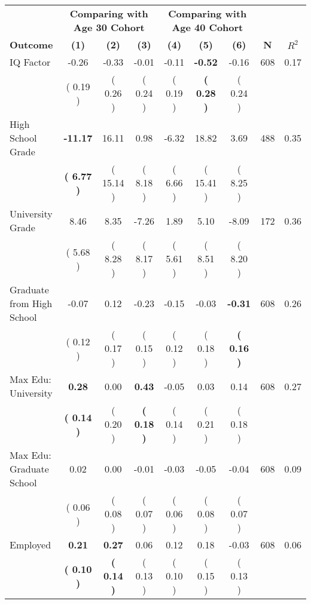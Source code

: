 \begin{tabular}{lcccccccc}
\toprule
 & \multicolumn{3}{c}{\textbf{Comparing with Age 30 Cohort}} & \multicolumn{3}{c}{\textbf{Comparing with Age 40 Cohort}} & \\
\cmidrule(lr){2-4} \cmidrule(lr){5-7} 
 \textbf{Outcome} & \textbf{(1)} & \textbf{(2)} & \textbf{(3)} & \textbf{(4)} & \textbf{(5)} & \textbf{(6)} & \textbf{N} & \textbf{$ R^2$} \\
\midrule
IQ Factor &     -0.26 &     -0.33 &     -0.01 &     -0.11 & \textbf{    -0.52} &     -0.16 & 608 &       0.17 \\ 
 & (     0.19 ) & (     0.26 ) & (     0.24 ) & (     0.19 ) & \textbf{(     0.28 )} & (     0.24 ) & \\
High School Grade & \textbf{   -11.17} &     16.11 &      0.98 &     -6.32 &     18.82 &      3.69 & 488 &       0.35 \\ 
 & \textbf{(     6.77 )} & (    15.14 ) & (     8.18 ) & (     6.66 ) & (    15.41 ) & (     8.25 ) & \\
University Grade &      8.46 &      8.35 &     -7.26 &      1.89 &      5.10 &     -8.09 & 172 &       0.36 \\ 
 & (     5.68 ) & (     8.28 ) & (     8.17 ) & (     5.61 ) & (     8.51 ) & (     8.20 ) & \\
Graduate from High School &     -0.07 &      0.12 &     -0.23 &     -0.15 &     -0.03 & \textbf{    -0.31} & 608 &       0.26 \\ 
 & (     0.12 ) & (     0.17 ) & (     0.15 ) & (     0.12 ) & (     0.18 ) & \textbf{(     0.16 )} & \\
Max Edu: University & \textbf{     0.28} &      0.00 & \textbf{     0.43} &     -0.05 &      0.03 &      0.14 & 608 &       0.27 \\ 
 & \textbf{(     0.14 )} & (     0.20 ) & \textbf{(     0.18 )} & (     0.14 ) & (     0.21 ) & (     0.18 ) & \\
Max Edu: Graduate School &      0.02 &      0.00 &     -0.01 &     -0.03 &     -0.05 &     -0.04 & 608 &       0.09 \\ 
 & (     0.06 ) & (     0.08 ) & (     0.07 ) & (     0.06 ) & (     0.08 ) & (     0.07 ) & \\
Employed & \textbf{     0.21} & \textbf{     0.27} &      0.06 &      0.12 &      0.18 &     -0.03 & 608 &       0.06 \\ 
 & \textbf{(     0.10 )} & \textbf{(     0.14 )} & (     0.13 ) & (     0.10 ) & (     0.15 ) & (     0.13 ) & \\

\end{tabular}
